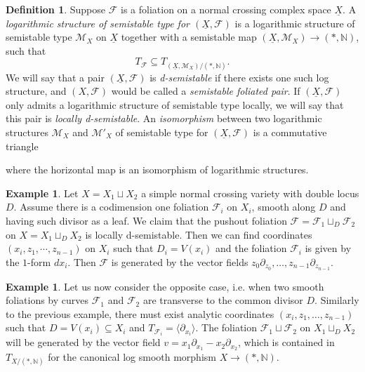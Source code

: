 \documentclass[reqno]{amsart}
\newcommand\N{\mathbb{N}}
\newcommand{\F}{\mathscr{F}}
\newcommand{\M}{\mathcal{M}}
\theoremstyle{definition}
\newtheorem{definition}[theorem]{Definition}
\newtheorem{example}[theorem]{Example}
\theoremstyle{named}
\begin{document}
\begin{definition}\label{def:semiestable_fol}
    Suppose $\F$ is a foliation on a normal crossing complex space $\underline{X}$. A \textit{logarithmic structure of semistable type for $(\underline{X},\F)$} is a logarithmic structure of semistable type $\M_X$ on $\underline{X}$ together with a semistable map  $(\underline{X},\M_X)\rightarrow (\ast,\N)$, such that $$T_\F\subseteq T_{(\underline{X},\M_X)/(\ast,\N)}.$$
We will say that a pair $(\underline{X},\F)$ is \textit{d-semistable} if there exists one such log structure, and $(X,\F)$ would be called a \textit{semistable foliated pair}. If $(\underline{X},\F)$ only admits a logarithmic structure of semistable type locally, we will say that this pair is \textit{locally d-semistable}. An \textit{isomorphism} between two logarithmic structures $\M_X$ and $\M'_X$ of semistable type for $(\underline{X},\F)$ is a commutative triangle 

\begin{center}
\end{center}
where the horizontal map is an isomorphism of logarithmic structures.
\end{definition}

\begin{example}\label{ex:glueleaf} Let $X = X_1\sqcup X_2$ a simple normal crossing variety with double locus $D$. Assume there is a codimension one foliation $\F_i$ on $X_i$, smooth along $D$ and having such divisor as a leaf. We claim that the pushout foliation $\F =\F_1\sqcup_D \F_2$ on $X = X_1\sqcup_D X_2$ is locally d-semistable. Then we can find coordinates $(x_i, z_1,\cdots,z_{n-1})$ on $X_i$ such that $D_i = V(x_i)$ and the foliation $\F_i$ is given by the $1$-form $dx_i$. Then $\F$ is generated by the vector fields $z_0\partial_{z_0},\dots, z_{n-1}\partial_{z_{n-1}}$. 
\end{example}


\begin{example}\label{ex:transverse}
Let us now consider the opposite case, i.e. when two smooth foliations by curves $\F_1$ and $\F_2$ are transverse to the common divisor $D$. Similarly to the previous example, there must exist analytic coordinates 
$(x_i,z_1,\dots,z_{n-1})$ such that $D=V(x_i)\subseteq X_i$ and $T_{\F_i}=\langle \partial_{x_i}\rangle$. The foliation $\F_1\sqcup \F_2$ on
$X_1\sqcup_D X_2$ will be generated by the vector field 
$v=x_1\partial_{x_1}-x_2\partial_{x_2}$,
which is contained in $T_{X/(\ast, \N)}$ for the canonical log smooth morphism $X\to (\ast, \N)$.
\end{example}
\end{document}
